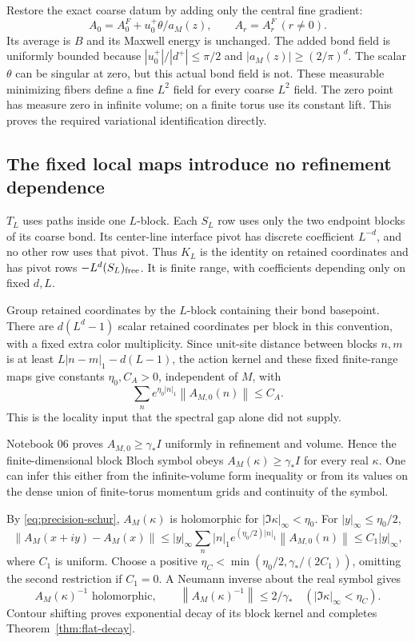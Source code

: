 \documentclass[11pt]{article}
\theoremstyle{remark}
\newcommand{\norm}[1]{\left\|#1\right\|}
\begin{document}
Restore the exact coarse datum by adding only the central fine gradient:
\[
 A_0=A_0^F+u_0^+\theta/a_M(z),\qquad A_r=A_r^F\ (r\ne0).
\]
Its average is $B$ and its Maxwell energy is unchanged. The added
bond field is uniformly bounded because
$|u_0^+|/|d^+|\le\pi/2$ and $|a_M(z)|\ge(2/\pi)^d$.
The scalar $\theta$ can be singular at zero, but this actual bond
field is not. These measurable minimizing fibers define a fine
$L^2$ field for every coarse $L^2$ field. The zero point has measure
zero in infinite volume; on a finite torus use its constant lift.
This proves the required variational identification directly.

\subsection{The fixed local maps introduce no refinement dependence}

$T_L$ uses paths inside one $L$-block. Each $S_L$ row uses only
the two endpoint blocks of its coarse bond. Its center-line interface
pivot has discrete coefficient $L^{-d}$, and no other row uses that
pivot. Thus $K_L$ is the identity on retained coordinates and has
pivot rows $-L^d(S_L)_{\rm free}$. It is finite range, with coefficients
depending only on fixed $d,L$.

Group retained coordinates by the $L$-block containing their bond
basepoint. There are $d(L^d-1)$ scalar retained coordinates per block
in this convention, with a fixed extra color multiplicity. Since
unit-site distance between blocks $n,m$ is at least
$L|n-m|_1-d(L-1)$, the action kernel and these fixed finite-range maps
give constants $\eta_0,C_A>0$, independent of $M$, with
\begin{equation}\label{eq:precision-schur}
 \sum_n e^{\eta_0|n|_1}\norm{A_{M,0}(n)}\le C_A.
\end{equation}
This is the locality input that the spectral gap alone did not supply.

Notebook 06 proves $A_{M,0}\ge\gamma_*I$ uniformly in refinement
and volume. Hence the finite-dimensional block Bloch symbol obeys
$A_M(\kappa)\ge\gamma_*I$ for every real $\kappa$.
One can infer this either from the infinite-volume form inequality
or from its values on the dense union of finite-torus momentum grids
and continuity of the symbol.

By \eqref{eq:precision-schur}, $A_M(\kappa)$ is holomorphic for
$|\Im\kappa|_\infty<\eta_0$. For $|y|_\infty\le\eta_0/2$,
\[
 \norm{A_M(x+iy)-A_M(x)}
 \le |y|_\infty\sum_n|n|_1 e^{(\eta_0/2)|n|_1}
                                      \norm{A_{M,0}(n)}
 \le C_1|y|_\infty,
\]
where $C_1$ is uniform. Choose a positive
$\eta_C<\min(\eta_0/2,\gamma_*/(2C_1))$, omitting the second
restriction if $C_1=0$. A Neumann inverse about the real symbol gives
\[
 A_M(\kappa)^{-1}\text{ holomorphic},\qquad
 \norm{A_M(\kappa)^{-1}}\le2/\gamma_*
 \quad(|\Im\kappa|_\infty<\eta_C).
\]
Contour shifting proves exponential decay of its block kernel and
completes Theorem~\ref{thm:flat-decay}.
\end{document}

